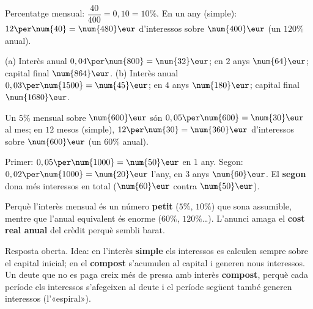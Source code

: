 \begin{solucions}
\begin{sollist}
  \item Percentatge mensual: $\dfrac{\num{40}}{\num{400}}=0,10=10\%$. En un any
        (simple): $12\per\num{40}=\num{480}\eur$ d'interessos sobre $\num{400}\eur$
        (un $120\%$ anual).
  \item (a) Interès anual $0,04\per\num{800}=\num{32}\eur$; en $2$ anys
        $\num{64}\eur$; capital final $\num{864}\eur$. \quad
        (b) Interès anual $0,03\per\num{1500}=\num{45}\eur$; en $4$ anys
        $\num{180}\eur$; capital final $\num{1680}\eur$.
  \item Un $5\%$ mensual sobre $\num{600}\eur$ són $0,05\per\num{600}=\num{30}\eur$ al
        mes; en $12$ mesos (simple), $12\per\num{30}=\num{360}\eur$ d'interessos sobre
        $\num{600}\eur$ (un $60\%$ anual).
  \item Primer: $0,05\per\num{1000}=\num{50}\eur$ en $1$ any. Segon:
        $0,02\per\num{1000}=\num{20}\eur$ l'any, en $3$ anys $\num{60}\eur$. El
        \textbf{segon} dona més interessos en total ($\num{60}\eur$ contra $\num{50}\eur$).
  \item Perquè l'interès mensual és un número \textbf{petit} ($5\%$, $10\%$) que sona
        assumible, mentre que l'anual equivalent és enorme ($60\%$, $120\%$\dots).
        L'anunci amaga el \textbf{cost real anual} del crèdit perquè sembli barat.
  \item Resposta oberta. Idea: en l'interès \textbf{simple} els interessos es calculen
        sempre sobre el capital inicial; en el \textbf{compost} s'acumulen al capital i
        generen nous interessos. Un deute que no es paga creix més de pressa amb interès
        \textbf{compost}, perquè cada període els interessos s'afegeixen al deute i el
        període següent també generen interessos (l'«espiral»).
\end{sollist}
\end{solucions}
